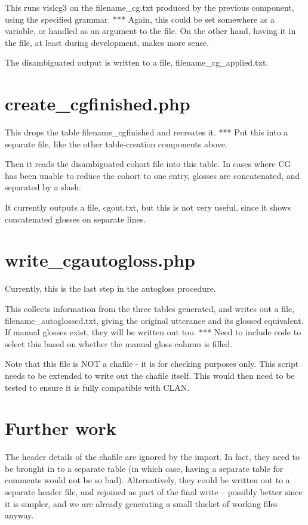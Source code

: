 \documentclass[a4paper,10pt]{article}
\begin{document}
This runs vislcg3 on the filename\_cg.txt produced by the previous component, using the specified grammar.
*** Again, this could be set somewhere as a variable, or handled as an argument to the file.  On the other hand, having it in the file, at least during development, makes more sense.

The disambiguated output is written to a file, filename\_cg\_applied.txt.


\section{create\_cgfinished.php}

This drops the table filename\_cgfinished and recreates it.
*** Put this into a separate file, like the other table-creation components above.

Then it reads the disambiguated cohort file into this table.  In cases where CG has been unable to reduce the cohort to one entry, glosses are concatenated, and separated by a slash.

It currently outputs a file, cgout.txt, but this is not very useful, since it shows concatenated glosses on separate lines.


\section{write\_cgautogloss.php}

Currently, this is the last step in the autogloss procedure.  

This collects information from the three tables generated, and writes out a file, filename\_autoglossed.txt, giving the original utterance and its glossed equivalent.  If manual glosses exist, they will be written out too.
*** Need to include code to select this based on whether the manual gloss column is filled.

Note that this file is NOT a chafile - it is for checking purposes only.  This script needs to be extended to write out the chafile itself.  This would then need to be tested to ensure it is fully compatible with CLAN.


\section{Further work}

The header details of the chafile are ignored by the import.  In fact, they need to be brought in to a separate table (in which case, having a separate table for comments would not be so bad).  Alternatively, they could be written out to a separate header file, and rejoined as part of the final write -- possibly better since it is simpler, and we are already generating a small thicket of working files anyway.
\end{document}
